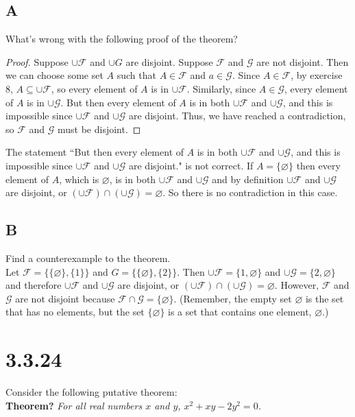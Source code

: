 \documentclass{article}
\newcommand{\n}{ \noindent }
\newcommand{\F}{\mathcal{F}}
\newcommand{\G}{\mathcal{G}}
\begin{document}
\subsection*{A}
What's wrong with the following proof of the theorem?

\begin{proof}
Suppose $\cup \F$ and $\cup G$ are disjoint. Suppose $\F$ and $\G$ are not disjoint. Then we can choose some set $A$ such that $A \in \F$ and $a \in \G$. Since $A \in \F$, by exercise 8, $A \subseteq \cup \F$, so every element of $A$ is in $\cup \F$. Similarly, since $A \in \G$, every element of $A$ is in $\cup \G$. But then every element of $A$ is in both $\cup \F$ and $\cup \G$, and this is impossible since $\cup \F$ and $\cup \G$ are disjoint. Thus, we have reached a contradiction, so $\F$ and $\G$ must be disjoint.
\end{proof}

\n The statement ``But then every element of $A$ is in both $\cup \F$ and $\cup \G$, and this is impossible since $\cup \F$ and $\cup \G$ are disjoint." is not correct. If $A = \{\varnothing\}$ then every element of $A$, which is $\varnothing$, is in both $\cup \F$ and $\cup \G$ and by definition $\cup \F$ and $\cup \G$ are disjoint, or $(\cup \F) \cap (\cup \G) = \varnothing$. So there is no contradiction in this case.

\subsection*{B}
Find a counterexample to the theorem. \\

\n Let $\F = \{\{\varnothing\}, \{1\}\}$ and $G = \{\{\varnothing\}, \{2\}\}$. Then $\cup \F = \{1, \varnothing\}$ and $\cup \G = \{2, \varnothing\}$ and therefore $\cup \F$ and $\cup \G$ are disjoint, or $(\cup \F) \cap (\cup \G) = \varnothing$. However, $\F$ and $\G$ are not disjoint because $\F \cap \G = \{\varnothing\}$. (Remember, the empty set $\varnothing$ is the set that has no elements, but the set $\{\varnothing\}$ is a set that contains one element, $\varnothing$.)

\section*{3.3.24}
Consider the following putative theorem: \\

\n \textbf{Theorem?} \textit{For all real numbers $x$ and $y$, $x^2 + xy - 2y^2 = 0$.} \\
\end{document}
